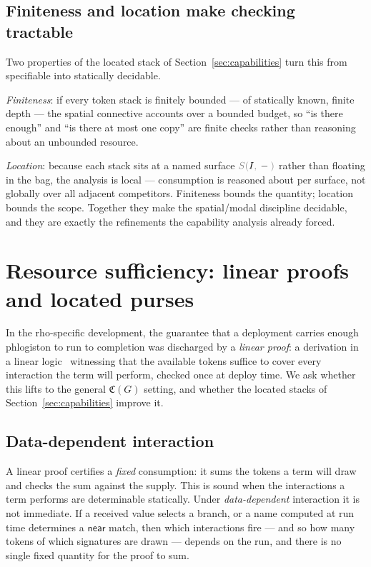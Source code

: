 \documentclass[11pt]{article}
\theoremstyle{definition}
\theoremstyle{plain}
\newcommand{\dec}[1]{\textcolor{costgray}{#1}}   %
\newcommand{\near}{\mathsf{near}}
\newcommand{\lstk}[2]{\dec{S(}{#1}\dec{,}\,#2\dec{)}}  %
\newcommand{\Cost}{\mathfrak{C}}              %
\begin{document}
\subsection{Finiteness and location make checking tractable}

Two properties of the located stack of Section~\ref{sec:capabilities} turn
this from specifiable into statically decidable.

\emph{Finiteness}: if every token stack is finitely bounded --- of
statically known, finite depth --- the spatial connective accounts over a
bounded budget, so ``is there enough'' and ``is there at most one copy''
are finite checks rather than reasoning about an unbounded resource.

\emph{Location}: because each stack sits at a named surface $\lstk{I}{-}$
rather than floating in the bag, the analysis is local --- consumption is
reasoned about per surface, not globally over all adjacent competitors.
Finiteness bounds the quantity; location bounds the scope. Together they
make the spatial/modal discipline decidable, and they are exactly the
refinements the capability analysis already forced.

\section{Resource sufficiency: linear proofs and located purses}
\label{sec:linear}

In the rho-specific development, the guarantee that a deployment carries
enough phlogiston to run to completion was discharged by a \emph{linear
proof}: a derivation in a linear logic~\cite{Girard1987} witnessing that the available
tokens suffice to cover every interaction the term will perform, checked
once at deploy time. We ask whether this lifts to the general $\Cost(G)$
setting, and whether the located stacks of
Section~\ref{sec:capabilities} improve it.

\subsection{Data-dependent interaction}

A linear proof certifies a \emph{fixed} consumption: it sums the tokens a
term will draw and checks the sum against the supply. This is sound when
the interactions a term performs are determinable statically. Under
\emph{data-dependent} interaction it is not immediate. If a received value
selects a branch, or a name computed at run time determines a $\near$
match, then which interactions fire --- and so how many tokens of which
signatures are drawn --- depends on the run, and there is no single fixed
quantity for the proof to sum.
\end{document}
